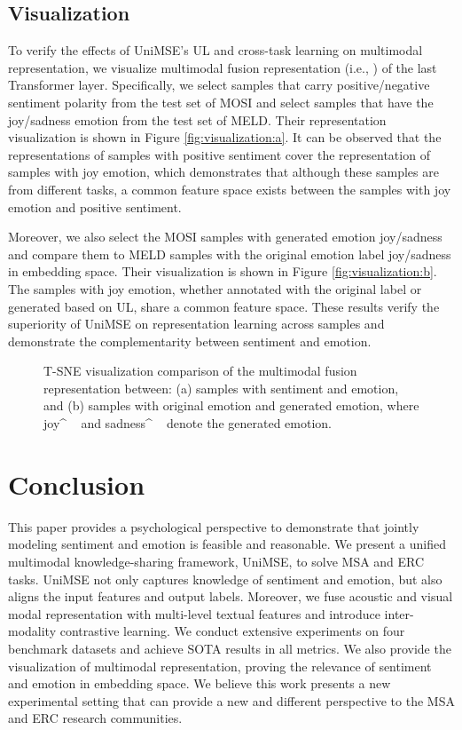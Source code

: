 \documentclass[11pt]{article}
\begin{document}
\subsection{Visualization}
To verify the effects of UniMSE's UL and cross-task learning on multimodal representation, we visualize multimodal fusion representation (i.e., ) of the last Transformer layer. Specifically, we select samples that carry positive/negative sentiment polarity from the test set of MOSI and select samples that have the joy/sadness emotion from the test set of MELD. Their representation visualization is shown in Figure \ref{fig:visualization:a}. It can be observed that the representations of samples with positive sentiment cover the representation of samples with joy emotion, which demonstrates that although these samples are from different tasks, a common feature space exists between the samples with joy emotion and positive sentiment.

Moreover, we also select the MOSI samples with generated emotion joy/sadness and compare them to MELD samples with the original emotion label joy/sadness in embedding space. Their visualization is shown in Figure \ref{fig:visualization:b}. The samples with joy emotion, whether annotated with the original label or generated based on UL, share a common feature space. These results verify the superiority of UniMSE on representation learning across samples and demonstrate the complementarity between sentiment and emotion.

\begin{figure}[t]
\centering
{}
\hspace{0.05in}
\caption{T-SNE visualization comparison of the multimodal fusion representation between: (a) samples with sentiment and emotion, and (b) samples with original emotion and generated emotion, where joy\^ ~ and sadness\^ ~ denote the generated emotion.}
\label{fig:visualization}
\end{figure}



\section{Conclusion}
This paper provides a psychological perspective to demonstrate that jointly modeling sentiment and emotion is feasible and reasonable. We present a unified multimodal knowledge-sharing framework, UniMSE, to solve MSA and ERC tasks. UniMSE not only captures knowledge of sentiment and emotion, but also aligns the input features and output labels. Moreover, we fuse acoustic and visual modal representation with multi-level textual features and introduce inter-modality contrastive learning. We conduct extensive experiments on four benchmark datasets and achieve SOTA results in all metrics. We also provide the visualization of multimodal representation, proving the relevance of sentiment and emotion in embedding space. We believe this work presents a new experimental setting that can provide a new and different perspective to the MSA and ERC research communities.
\end{document}
